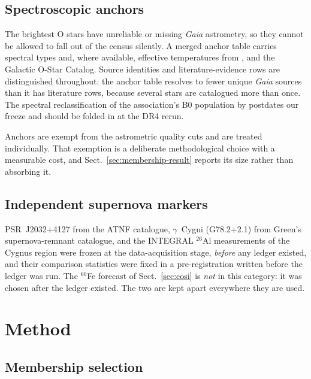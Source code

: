 \documentclass{aa}
\begin{document}
\subsection{Spectroscopic anchors}

The brightest O stars have unreliable or missing \textit{Gaia} astrometry, so
they cannot be allowed to fall out of the census silently. A merged anchor table
carries spectral types and, where available, effective temperatures from
\citet{wright2015}, \citet{berlanas2019, berlanas2020} and the Galactic O-Star
Catalog. Source identities and literature-evidence rows are distinguished
throughout: the anchor table resolves to fewer unique \textit{Gaia} sources than
it has literature rows, because several stars are catalogued more than once. The
spectral reclassification of the association's B0 population by
\citet{fastrotators2025} postdates our freeze and should be folded in at the DR4
rerun.

Anchors are exempt from the astrometric quality cuts and are treated
individually. That exemption is a deliberate methodological choice with a
measurable cost, and Sect.~\ref{sec:membership-result} reports its size rather
than absorbing it.

\subsection{Independent supernova markers}

PSR~J2032+4127 from the ATNF catalogue, $\gamma$~Cygni (G78.2+2.1) from Green's
supernova-remnant catalogue, and the INTEGRAL $^{26}$Al measurements of the
Cygnus region were frozen at the data-acquisition stage, \emph{before} any
ledger existed, and their comparison statistics were fixed in a pre-registration
written before the ledger was run. The $^{60}$Fe forecast of
Sect.~\ref{sec:cosi} is \emph{not} in this category: it was chosen after the
ledger existed. The two are kept apart everywhere they are used.

\section{Method}\label{sec:method}

\subsection{Membership selection}\label{sec:membership}
\end{document}
